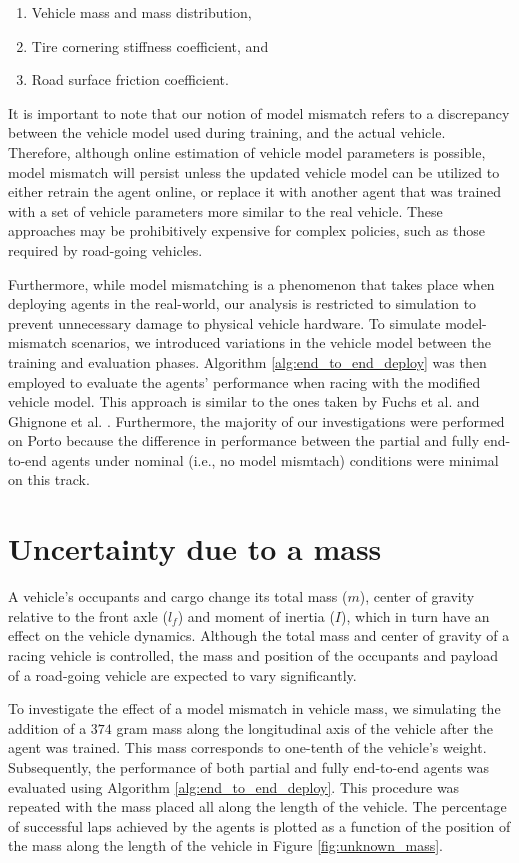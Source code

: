 \begin{enumerate}
\item Vehicle mass and mass distribution,
\item Tire cornering stiffness coefficient, and
\item Road surface friction coefficient.
\end{enumerate}


It is important to note that our notion of model mismatch refers to a discrepancy between the vehicle model used during training, and the actual vehicle.
Therefore, although online estimation of vehicle model parameters is possible, model mismatch will persist unless the updated vehicle model can be utilized to either retrain the agent online, or replace it with another agent that was trained with a set of vehicle parameters more similar to the real vehicle.
These approaches may be prohibitively expensive for complex policies, such as those required by road-going vehicles.

Furthermore, while model mismatching is a phenomenon that takes place when deploying agents in the real-world, our analysis is restricted to simulation to prevent unnecessary damage to physical vehicle hardware.
To simulate model-mismatch scenarios, we introduced variations in the vehicle model between the training and evaluation phases.
Algorithm \ref{alg:end_to_end_deploy} was then employed to evaluate the agents' performance when racing with the modified vehicle model.
This approach is similar to the ones taken by Fuchs et al. \cite{Fuchs2021} and Ghignone et al. \cite{Ghignone2022}.
Furthermore, the majority of our investigations were performed on Porto because the difference in performance between the partial and fully end-to-end agents under nominal (i.e., no model mismtach) conditions were minimal on this track.


\section{Uncertainty due to a mass}

A vehicle's occupants and cargo change its total mass ($m$), center of gravity relative to the front axle ($l_f$) and moment of inertia ($I$), which in turn have an effect on the vehicle dynamics.
Although the total mass and center of gravity of a racing vehicle is controlled, the mass and position of the occupants and payload of a road-going vehicle are expected to vary significantly.

To investigate the effect of a model mismatch in vehicle mass, we simulating the addition of a $374$ gram mass along the longitudinal axis of the vehicle after the agent was trained. 
This mass corresponds to one-tenth of the vehicle's weight. 
Subsequently, the performance of both partial and fully end-to-end agents was evaluated using Algorithm \ref{alg:end_to_end_deploy}. 
This procedure was repeated with the mass placed all along the length of the vehicle.
The percentage of successful laps achieved by the agents is plotted as a function of the position of the mass along the length of the vehicle in Figure \ref{fig:unknown_mass}.

